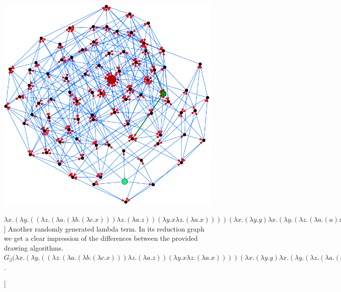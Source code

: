 \begin{figure}[htbp]
{		\includegraphics[height=\exampleheight]{../images/finite_ex_2_NEATO.png}
	}
	
	\caption
	[$\lambda x.(\lambda y.((\lambda z.(\lambda a.(\lambda b.(\lambda c.x))) \lambda z.(\lambda a.z)) (\lambda y.x \lambda z.(\lambda a.x))
	)) (\lambda x.(\lambda y.y) \lambda x.(\lambda y.(\lambda z.(\lambda a.(a) z))))$]
	{Another randomly generated lambda term. In its reduction graph we
	get a clear impression of the differences between the provided drawing algorithms.
	$G_\beta\big(
	\lambda x.(\lambda y.((\lambda z.(\lambda a.(\lambda b.(\lambda c.x))) \lambda z.(\lambda a.z)) (\lambda y.x \lambda z.(\lambda a.x))
	)) (\lambda x.(\lambda y.y) \lambda x.(\lambda y.(\lambda z.(\lambda a.(a) z))))
	\big)$.}
	\label{fig:images_finite_ex_2_CIRCO}
\end{figure}

